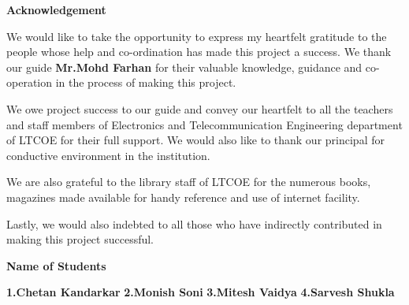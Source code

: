 \newpage
\begin{center}
\LARGE\textbf	{Acknowledgement} 
		
\end{center}

\vspace{2cm} 

We would like to take the opportunity to express my heartfelt gratitude to the people whose help and co-ordination has made this project a success. We thank our guide \textbf
{Mr.Mohd Farhan}  for their valuable knowledge, guidance and co-operation in the process of making this project.

We owe project success to our guide and convey our heartfelt to all the teachers and staff members of Electronics and Telecommunication Engineering department of LTCOE for their full support. We would also like to thank our principal for conductive environment in the institution.

We are also grateful to the library staff of LTCOE for the numerous books, magazines made available for handy reference and use of internet facility.

Lastly, we would also indebted to all those who have indirectly contributed in making this project successful.






\vspace{2.00cm}



\begin{flushleft}

\end{flushleft}

\begin{flushleft}
\hspace{80.00mm} \begin{large} \textbf{ Name of Students}\end{large} 
\end{flushleft}

	\begin{flushleft}	 
	\hspace{84.00mm} \vspace{0.3cm} \textbf{1.Chetan Kandarkar} 
		\vspace{0.3cm}
	\hspace{84.00mm} \textbf{2.Monish Soni}
		\vspace{0.3cm}
	\hspace{84.00mm} \textbf{3.Mitesh Vaidya} 
		\vspace{0.3cm}
	\hspace{84.00mm} \textbf{4.Sarvesh Shukla}
		\vspace{0.3cm}	    
	\end{flushleft}  
  



